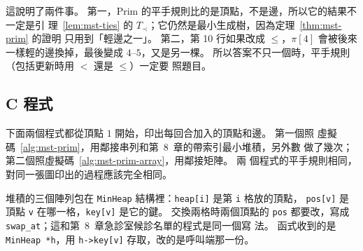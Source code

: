 這說明了兩件事。 第一，Prim 的平手規則比的是頂點，不是邊，所以它的結果不一定是引
理~\ref{lem:mst-ties} 的 $T_{\prec}$；它仍然是最小生成樹，因為定理~\ref{thm:mst-prim} 的證明
只用到「輕邊之一」。 第二，第 10 行如果改成 $\le$，$\pi[4]$ 會被後來一樣輕的邊換掉，最後變成
$4$--$5$，又是另一棵。 所以答案不只一個時，平手規則（包括更新時用 $<$ 還是 $\le$）一定要
照題目。

\subsection{C 程式}

下面兩個程式都從頂點 $1$ 開始，印出每回合加入的頂點和邊。 第一個照
虛擬碼~\ref{alg:mst-prim}，用鄰接串列和第~8~章的帶索引最小堆積，另外數
 做了幾次；第二個照虛擬碼~\ref{alg:mst-prim-array}，用鄰接矩陣。 兩
個程式的平手規則相同，對同一張圖印出的過程應該完全相同。

\begin{cbookrecap}
堆積的三個陣列包在 \texttt{MinHeap} 結構裡：\texttt{heap[i]} 是第 \texttt{i} 格放的頂點，
\texttt{pos[v]} 是頂點 \texttt{v} 在哪一格，\texttt{key[v]} 是它的鍵。 交換兩格時兩個頂點的
\texttt{pos} 都要改，寫成 \texttt{swap\_at}；這和第~8~章急診室候診名單的程式是同一個寫
法。 函式收到的是 \texttt{MinHeap *h}，用 \texttt{h->key[v]} 存取，改的是呼叫端那一份。
\end{cbookrecap}

